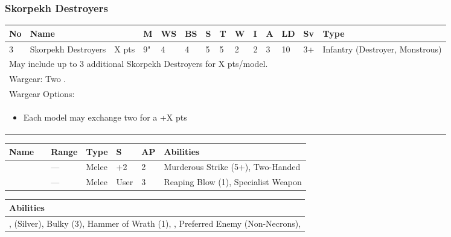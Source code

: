 \newpage
\subsubsection{Skorpekh Destroyers}

\noindent
\begin{tabular}{||m{10pt} m{95pt} m{30pt} m{11pt} m{11pt} m{11pt} m{11pt} m{11pt} m{11pt} m{11pt} m{11pt} m{11pt} m{11pt} m{125pt}||}
	\hline
	No & Name & & M & WS & BS & S & T & W & I & A & LD & Sv & Type \\
	\hline
	3 & Skorpekh Destroyers & X pts & 9" & 4 & 4 & 5 & 5 & 2 & 2 & 3 & 10 & 3+ & Infantry (Destroyer, Monstrous) \\
	\hline
	\hline
	\multicolumn{14}{||Z{532 pt}||}{May include up to 3 additional Skorpekh Destroyers for X pts/model.}\\	
	\hline
	\hline
	\multicolumn{14}{||Z{532 pt}||}{Wargear: Two \quickref{Hyperphase Thresher}.} \\
	\multicolumn{14}{||Z{532 pt}||}{Wargear Options:} \\	\multicolumn{14}{||Z{532 pt}||}{\begin{itemize}
			\item Each model may exchange two \quickref{Hyperphase Thresher} for a \quickref{Hyperphase Reap-Blade} \hrulefill +X pts
	\end{itemize}} \\
	\hline
\end{tabular}

\noindent
\begin{tabular}{||m{110pt} m{30pt} m{31pt} m{55pt} m{12pt} m{12pt} m{210pt}||}
	\hline
	Name & & Range & Type & S & AP & Abilities \\
	\hline
	\quickref{Hyperphase Reap-Blade} &  & — & Melee & +2 & 2 & Murderous Strike (5+), Two-Handed \\
	\quickref{Hyperphase Thresher} &  & — & Melee & User & 3 & Reaping Blow (1), Specialist Weapon \\
	\hline
\end{tabular}

\noindent
\begin{tabular}{||m{532pt}||}
	\hline
	Abilities \\
	\hline
	\quickref{Annihilation Protocols}, \quickref{Awakening Protocols} (Silver), Bulky (3), Hammer of Wrath (1), \quickref{Living Metal}, Preferred Enemy (Non-Necrons), \quickref{Reanimation Protocols} \\
	\hline
\end{tabular}



